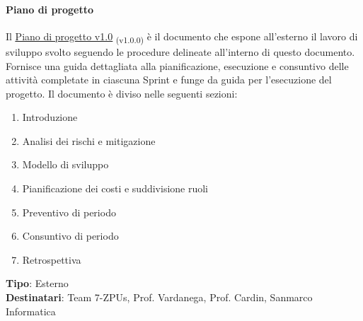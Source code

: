 \documentclass[a4paper,12pt]{article}
\newcommand{\ped}[1]{\textsubscript{#1}}
\begin{document}
\paragraph{Piano di progetto}\label{pianoDiProgetto}
Il
\href{https://7-zpus.github.io/Docs/assets/2_RTB/DocumentiEsterni/PianoDiProgetto.pdf}{\ul{Piano
        di progetto v1.0}} \ped{(v1.0.0)} è il
documento che espone all'esterno il lavoro di sviluppo svolto seguendo le
procedure delineate all'interno di questo documento. Fornisce una guida
dettagliata alla pianificazione, esecuzione e consuntivo delle attività
completate in ciascuna Sprint e funge da guida per l'esecuzione del progetto. Il documento è diviso nelle seguenti sezioni:
\begin{enumerate}
    \item Introduzione
    \item Analisi dei rischi e mitigazione
    \item Modello di sviluppo
    \item Pianificazione dei costi e suddivisione ruoli
    \item Preventivo di periodo
    \item Consuntivo di periodo
    \item Retrospettiva
\end{enumerate}
\textbf{Tipo}: Esterno \\
\textbf{Destinatari}: Team 7-ZPUs, Prof. Vardanega, Prof. Cardin, Sanmarco Informatica \\
\end{document}
